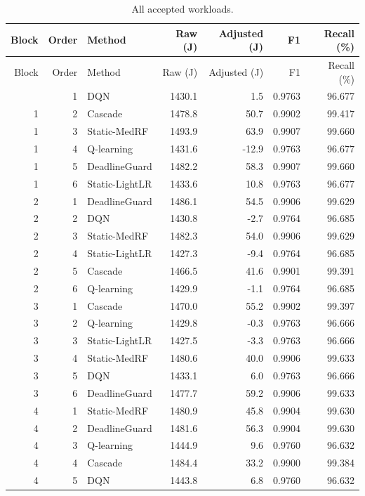 \small\setlength{\tabcolsep}{5pt}\begin{longtable}{rrlrrrr}
\caption{All accepted workloads.}\label{tab:runs}\\
\toprule Block & Order & Method & Raw (J) & Adjusted (J) & F1 & Recall (\%)\\\midrule\endfirsthead
\toprule Block & Order & Method & Raw (J) & Adjusted (J) & F1 & Recall (\%)\\\midrule\endhead
\bottomrule\endfoot
1 & 1 & DQN & 1430.1 & 1.5 & 0.9763 & 96.677\\
1 & 2 & Cascade & 1478.8 & 50.7 & 0.9902 & 99.417\\
1 & 3 & Static-MedRF & 1493.9 & 63.9 & 0.9907 & 99.660\\
1 & 4 & Q-learning & 1431.6 & -12.9 & 0.9763 & 96.677\\
1 & 5 & DeadlineGuard & 1482.2 & 58.3 & 0.9907 & 99.660\\
1 & 6 & Static-LightLR & 1433.6 & 10.8 & 0.9763 & 96.677\\
2 & 1 & DeadlineGuard & 1486.1 & 54.5 & 0.9906 & 99.629\\
2 & 2 & DQN & 1430.8 & -2.7 & 0.9764 & 96.685\\
2 & 3 & Static-MedRF & 1482.3 & 54.0 & 0.9906 & 99.629\\
2 & 4 & Static-LightLR & 1427.3 & -9.4 & 0.9764 & 96.685\\
2 & 5 & Cascade & 1466.5 & 41.6 & 0.9901 & 99.391\\
2 & 6 & Q-learning & 1429.9 & -1.1 & 0.9764 & 96.685\\
3 & 1 & Cascade & 1470.0 & 55.2 & 0.9902 & 99.397\\
3 & 2 & Q-learning & 1429.8 & -0.3 & 0.9763 & 96.666\\
3 & 3 & Static-LightLR & 1427.5 & -3.3 & 0.9763 & 96.666\\
3 & 4 & Static-MedRF & 1480.6 & 40.0 & 0.9906 & 99.633\\
3 & 5 & DQN & 1433.1 & 6.0 & 0.9763 & 96.666\\
3 & 6 & DeadlineGuard & 1477.7 & 59.2 & 0.9906 & 99.633\\
4 & 1 & Static-MedRF & 1480.9 & 45.8 & 0.9904 & 99.630\\
4 & 2 & DeadlineGuard & 1481.6 & 56.3 & 0.9904 & 99.630\\
4 & 3 & Q-learning & 1444.9 & 9.6 & 0.9760 & 96.632\\
4 & 4 & Cascade & 1484.4 & 33.2 & 0.9900 & 99.384\\
4 & 5 & DQN & 1443.8 & 6.8 & 0.9760 & 96.632\\

\end{longtable}
